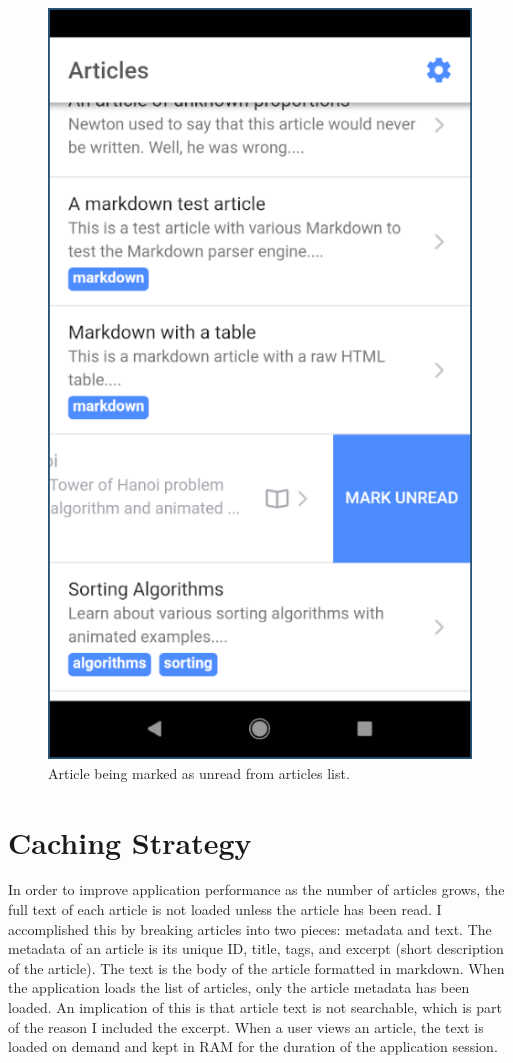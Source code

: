 \documentclass[12pt]{report}
\begin{document}
\begin{figure}
    \centering
    \includegraphics[scale=0.5]{images/avd-article-mark-unread.png}
    \caption{Article being marked as unread from articles list.}
    \label{fig:avd-article-mark-unread}
\end{figure}

    \section{Caching Strategy}

In order to improve application performance as the number of articles grows, the
full text of each article is not loaded unless the article has been read. I
accomplished this by breaking articles into two pieces: metadata and text. The
metadata of an article is its unique ID, title, tags, and excerpt (short
description of the article). The text is the body of the article formatted in
markdown. When the application loads the list of articles, only the article
metadata has been loaded. An implication of this is that article text is not
searchable, which is part of the reason I included the excerpt. When a user
views an article, the text is loaded on demand and kept in RAM for the duration
of the application session.
\end{document}
